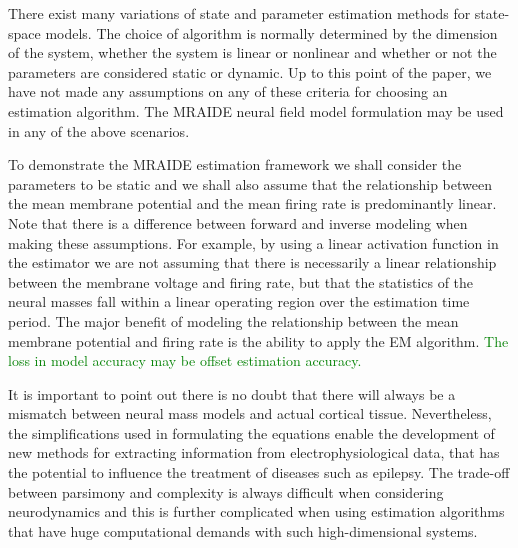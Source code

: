 \documentclass[review,authoryear,3p]{elsarticle}
\newcommand{\dean}[1]{\textcolor{green}{#1}}
\begin{document}
There exist many variations of state and parameter estimation methods for state-space models. The choice of algorithm is normally determined by the dimension of the system, whether the system is linear or nonlinear and whether or not the parameters are considered static or dynamic. Up to this point of the paper, we have not made any assumptions on any of these criteria for choosing an estimation algorithm. The MRAIDE neural field model formulation may be used in any of the above scenarios. 

To demonstrate the MRAIDE estimation framework we shall consider the parameters to be static and we shall also assume that the relationship between the mean membrane potential and the mean firing rate is predominantly linear. Note that there is a difference between forward and inverse modeling when making these assumptions. For example, by using a linear activation function in the estimator we are not assuming that there is necessarily a linear relationship between the membrane voltage and firing rate, but that the statistics of the neural masses fall within a linear operating region over the estimation time period. The major benefit of modeling the relationship between the mean membrane potential and firing rate is the ability to apply the EM algorithm. \dean{The loss in model accuracy may be offset estimation accuracy. }

It is important to point out there is no doubt that there will always be a mismatch between neural mass models and actual cortical tissue. Nevertheless, the simplifications used in formulating the equations enable the development of new methods for extracting information from electrophysiological data, that has the potential to influence the treatment of diseases such as epilepsy. The trade-off between parsimony and complexity is always difficult when considering neurodynamics and this is further complicated when using estimation algorithms that have huge computational demands with such high-dimensional systems.  

\end{document}
